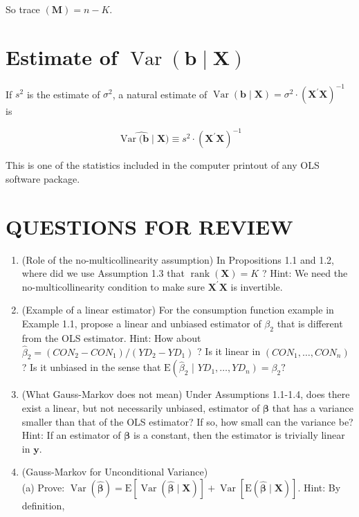\documentclass[10pt]{article}
\begin{document}
So trace $(\mathbf{M})=n-K$.

\section*{Estimate of $\operatorname{Var}(\mathbf{b} \mid \mathbf{X})$}
If $s^{2}$ is the estimate of $\sigma^{2}$, a natural estimate of $\operatorname{Var}(\mathbf{b} \mid \mathbf{X})=\sigma^{2} \cdot\left(\mathbf{X}^{\prime} \mathbf{X}\right)^{-1}$ is


\begin{equation*}
\widehat{\operatorname{Var}(\mathbf{b} \mid \mathbf{X}}) \equiv s^{2} \cdot\left(\mathbf{X}^{\prime} \mathbf{X}\right)^{-1} \tag{1.3.4}
\end{equation*}


This is one of the statistics included in the computer printout of any OLS software package.

\section*{QUESTIONS FOR REVIEW}
\begin{enumerate}
  \item (Role of the no-multicollinearity assumption) In Propositions 1.1 and 1.2, where did we use Assumption 1.3 that $\operatorname{rank}(\mathbf{X})=K$ ? Hint: We need the no-multicollinearity condition to make sure $\mathbf{X}^{\prime} \mathbf{X}$ is invertible.
  \item (Example of a linear estimator) For the consumption function example in Example 1.1, propose a linear and unbiased estimator of $\beta_{2}$ that is different from the OLS estimator. Hint: How about $\widehat{\beta}_{2}=\left(C O N_{2}-C O N_{1}\right) /\left(Y D_{2}-Y D_{1}\right)$ ? Is it linear in $\left(C O N_{1}, \ldots, C O N_{n}\right)$ ? Is it unbiased in the sense that $\mathrm{E}\left(\widehat{\beta}_{2}\right.$ | $\left.Y D_{1}, \ldots, Y D_{n}\right)=\beta_{2} ?$
  \item (What Gauss-Markov does not mean) Under Assumptions 1.1-1.4, does there exist a linear, but not necessarily unbiased, estimator of $\boldsymbol{\beta}$ that has a variance smaller than that of the OLS estimator? If so, how small can the variance be?\\
Hint: If an estimator of $\boldsymbol{\beta}$ is a constant, then the estimator is trivially linear in $\mathbf{y}$.
  \item (Gauss-Markov for Unconditional Variance)\\
(a) Prove: $\operatorname{Var}(\widehat{\boldsymbol{\beta}})=\mathrm{E}[\operatorname{Var}(\widehat{\boldsymbol{\beta}} \mid \mathbf{X})]+\operatorname{Var}[\mathrm{E}(\widehat{\boldsymbol{\beta}} \mid \mathbf{X})]$. Hint: By definition,
\end{enumerate}
\end{document}
